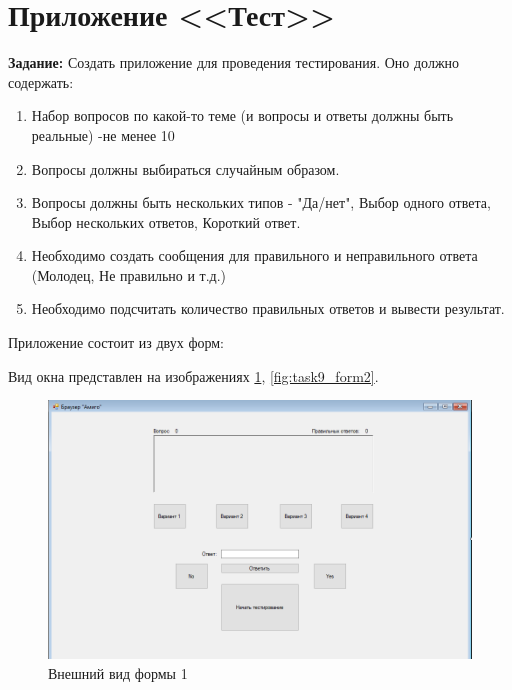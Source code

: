 \section{Приложение <<Тест>>}

\textbf{Задание:} Создать приложение для проведения тестирования. Оно должно содержать:

\begin{enumerate}
    \item Набор вопросов по какой-то теме (и вопросы и ответы должны быть реальные) -не менее 10
    \item Вопросы должны выбираться случайным образом.
    \item Вопросы должны быть нескольких типов - "Да/нет", Выбор одного ответа, Выбор нескольких ответов, Короткий ответ.
    \item Необходимо создать сообщения для правильного и неправильного ответа (Молодец, Не правильно и т.д.)
    \item Необходимо подсчитать количество правильных ответов и вывести результат.
\end{enumerate}

Приложение состоит из двух форм:

Вид окна представлен на изображениях \ref{fig:task9_form1}, \ref{fig:task9_form2}.
\begin{figure}[H]
    \centering
    \includegraphics[scale=0.6]{task9/form1.png}
    \caption{Внешний вид формы 1}
    \label{fig:task9_form1}
\end{figure}

